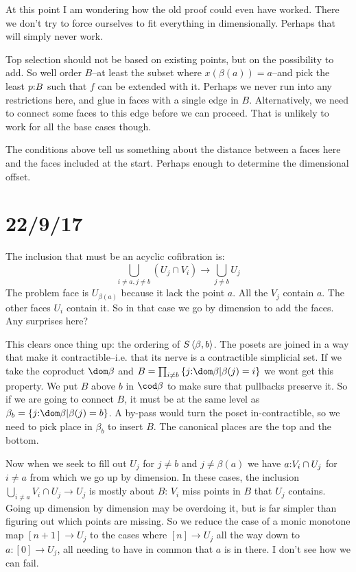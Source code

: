 \documentclass[csh.tex]{subfiles}
\begin{document}
At this point I am wondering how the old proof could even have worked. There we don't try to force ourselves to fit everything in dimensionally.
Perhaps that will simply never work.

Top selection should not be based on existing points, but on the possibility to add.
So well order $B$--at least the subset where $x(\beta(a)) = a$--and pick the least $p\mathord : B$ such that $f$ can be extended with it.
Perhaps we never run into any restrictions here, and glue in faces with a single edge in $B$.
Alternatively, we need to connect some faces to this edge before we can proceed.
That is unlikely to work for all the base cases though.

The conditions above tell us something about the distance between a faces here and the faces included at the start. Perhaps enough to determine the dimensional offset.


\section{22/9/17}
The inclusion that must be an acyclic cofibration is:
\[ \bigcup_{i\neq a,j\neq b}(U_j\cap V_i) \to \bigcup_{j\neq b}U_j\]
The problem face is $U_{\beta(a)}$ because it lack the point $a$. All the $V_j$ contain $a$. The other faces $U_i$ contain it. So in that case we go by dimension to add the faces. Any surprises here?

This clears once thing up: the ordering of $S\left\langle \beta,b \right\rangle$. The posets are joined in a way that make it contractible--i.e. that its nerve is a contractible simplicial set. If we take the coproduct $\dom\beta$ and $B = \prod_{i\neq b}\set{j\of\dom\beta|\beta(j)=i}$ we wont get this property. We put $B$ above $b$ in $\cod\beta$ to make sure that pullbacks preserve it. So if we are going to connect $B$, it must be at the same level as $\beta_b = \set{j\of\dom\beta|\beta(j)=b}$. A by-pass would turn the poset in-contractible, so we need to pick place in $\beta_b$ to insert $B$. The canonical places are the top and the bottom.

Now when we seek to fill out $U_j$ for $j\neq b$ and $j\neq \beta(a)$ we
have $a\mathord : V_i\cap U_j$ for $i\neq a$ from which we go up by dimension. 
In these cases, the inclusion $\bigcup_{i\neq a} V_i\cap U_j \to U_j$ is
mostly about $B$: $V_i$ miss points in $B$ that $U_j$ contains. Going up dimension by dimension may be overdoing it, but is far simpler than figuring out which points are missing. So we reduce the case of a monic monotone map $[n + 1]\to U_j$ to the cases where $[n]\to U_j$ all the way down to $a:[0]\to U_j$, all needing to have in common that $a$ is in there. I don't see how we can fail.
\end{document}
